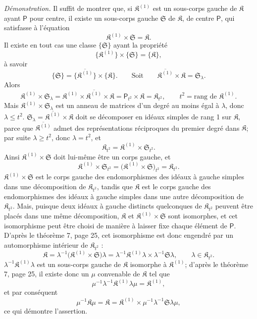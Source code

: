 \emph{Démonstration.} Il suffit de montrer que, si \(\mathfrak K^{(1)}\) est un sous-corps gauche de \(\mathfrak K\) ayant \(\mathsf P\) pour centre, il existe un sous-corps gauche \(\mathfrak S\) de \(\mathfrak K\), de centre \(\mathsf P\), qui satisfasse à l'équation
\[
\mathfrak K^{(1)}\times\mathfrak S=\mathfrak K.
\]
Il existe en tout cas une classe \(\{\mathfrak S\}\) ayant la propriété
\[
\{\mathfrak K^{(1)}\}\times\{\mathfrak S\}=\{\mathfrak K\},
\]
à savoir
\[
\{\mathfrak S\}=\{\overline{\mathfrak K^{(1)}}\}\times\{\mathfrak K\}.
\qquad
\text{Soit}\qquad
\overline{\mathfrak K^{(1)}}\times\mathfrak K=\mathfrak S_\lambda.
\]
Alors
\[
\mathfrak K^{(1)}\times\mathfrak S_\lambda
=\mathfrak K^{(1)}\times\overline{\mathfrak K^{(1)}}\times\mathfrak K
=\mathsf P_{t^2}\times\mathfrak K
=\mathfrak K_{t^2},
\qquad
t^2=\text{rang de }\mathfrak K^{(1)}.
\]
Mais \(\mathfrak K^{(1)}\times\mathfrak S_\lambda\) est un anneau de matrices d'un degré au moins égal à \(\lambda\), donc \(\lambda\leq t^2\). \(\mathfrak S_\lambda=\overline{\mathfrak K^{(1)}}\times\mathfrak K\) doit se décomposer en idéaux simples de rang 1 sur \(\mathfrak K\), parce que \(\overline{\mathfrak K^{(1)}}\) admet des représentations réciproques du premier degré dans \(\mathfrak K\); par suite \(\lambda\geq t^2\), donc \(\lambda=t^2\), et
\[
\mathfrak K_{t^2}=\mathfrak K^{(1)}\times\mathfrak S_{t^2}.
\]
Ainsi \(\mathfrak K^{(1)}\times\mathfrak S\) doit lui-même être un corps gauche, et
\[
\mathfrak K^{(1)}\times\mathfrak S_{t^2}
=\bigl(\mathfrak K^{(1)}\times\mathfrak S\bigr)_{t^2}
=\mathfrak K_{t^2}.
\]
\(\mathfrak K^{(1)}\times\mathfrak S\) est le corps gauche des endomorphismes des idéaux à gauche simples dans une décomposition de \(\mathfrak K_{t^2}\), tandis que \(\mathfrak K\) est le corps gauche des endomorphismes des idéaux à gauche simples dans une autre décomposition de \(\mathfrak K_{t^2}\). Mais, puisque deux idéaux à gauche distincts quelconques de \(\mathfrak K_{t^2}\) peuvent être placés dans une même décomposition, \(\mathfrak K\) et \(\mathfrak K^{(1)}\times\mathfrak S\) sont isomorphes, et cet isomorphisme peut être choisi de manière à laisser fixe chaque élément de \(\mathsf P\). D'après le théorème 7, page 25, cet isomorphisme est donc engendré par un automorphisme intérieur de \(\mathfrak K_{t^2}\) :
\[
\mathfrak K
=\lambda^{-1}\bigl(\mathfrak K^{(1)}\times\mathfrak S\bigr)\lambda
=\lambda^{-1}\mathfrak K^{(1)}\lambda\times\lambda^{-1}\mathfrak S\lambda,
\qquad
\lambda\in\mathfrak K_{t^2}.
\]
\(\lambda^{-1}\mathfrak K^{(1)}\lambda\) est un sous-corps gauche de \(\mathfrak K\) isomorphe à \(\mathfrak K^{(1)}\); d'après le théorème 7, page 25, il existe donc un \(\mu\) convenable de \(\mathfrak K\) tel que
\[
\mu^{-1}\lambda^{-1}\mathfrak K^{(1)}\lambda\mu=\mathfrak K^{(1)},
\]
et par conséquent
\[
\mu^{-1}\mathfrak K\mu
=\mathfrak K
=\mathfrak K^{(1)}\times\mu^{-1}\lambda^{-1}\mathfrak S\lambda\mu,
\]
ce qui démontre l'assertion.

